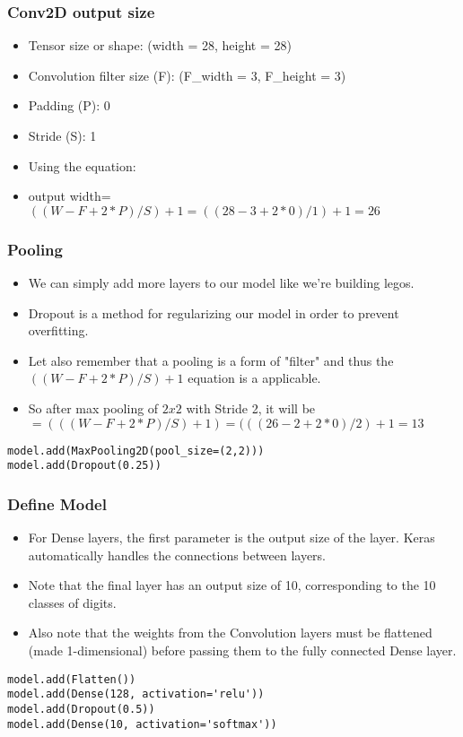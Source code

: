 \begin{frame}[fragile] \frametitle{Conv2D output size}

\begin{itemize}
\item Tensor size or shape: (width = 28, height = 28)
\item Convolution filter size (F): (F\_width = 3, F\_height = 3)
\item Padding (P): 0
\item Stride (S): 1
\item Using the equation:
\item output width=$((W-F+2*P )/S)+ 1 = ((28-3+2*0)/1) + 1 = 26$
\end{itemize}


\end{frame}


\begin{frame}[fragile] \frametitle{Pooling}

\begin{itemize}
\item We can simply add more layers to our model like we're building legos.
\item Dropout is a method for regularizing our model in order to prevent overfitting. 
\item Let also remember that a pooling is a form of "filter" and thus the $((W-F+2*P )/S)+ 1$ equation is a applicable.
\item So after max pooling of $2x2$ with Stride 2, it will be $=(((W-F+2*P )/S)+1) = (((26-2+2*0)/2)+1 = 13$
\end{itemize}
\begin{lstlisting}
model.add(MaxPooling2D(pool_size=(2,2)))
model.add(Dropout(0.25))
\end{lstlisting}

\end{frame}

\begin{frame}[fragile] \frametitle{Define Model}

\begin{itemize}
\item For Dense layers, the first parameter is the output size of the layer. Keras automatically handles the connections between layers.
\item Note that the final layer has an output size of 10, corresponding to the 10 classes of digits.
\item Also note that the weights from the Convolution layers must be flattened (made 1-dimensional) before passing them to the fully connected Dense layer.
\end{itemize}
\begin{lstlisting}
model.add(Flatten())
model.add(Dense(128, activation='relu'))
model.add(Dropout(0.5))
model.add(Dense(10, activation='softmax'))
\end{lstlisting}
\end{frame}

